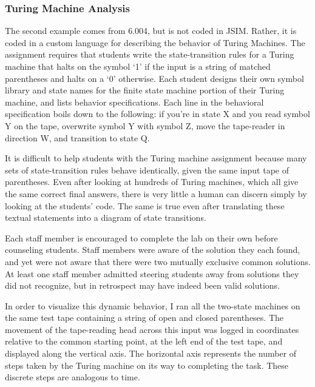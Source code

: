 \documentclass[12pt]{article}
\begin{document}
\subsubsection{Turing Machine Analysis}

The second example comes from 6.004, but is not coded in JSIM. Rather, it is coded in a custom language for describing the behavior of Turing Machines. The assignment requires that students write the state-transition rules for a Turing machine that halts on the symbol `1' if the input is a string of matched parentheses and halts on a `0' otherwise. Each student designs their own symbol library and state names for the finite state machine portion of their Turing machine, and lists behavior specifications. Each line in the behavioral specification boils down to the following: if you're in state X and you read symbol Y on the tape, overwrite symbol Y with symbol Z, move the tape-reader in direction W, and transition to state Q.

It is difficult to help students with the Turing machine assignment because many sets of state-transition rules behave identically, given the same input tape of parentheses. Even after looking at hundreds of Turing machines, which all give the same correct final answers, there is very little a human can discern simply by looking at the students' code. The same is true even after translating these textual statements into a diagram of state transitions.

Each staff member is encouraged to complete the lab on their own before counseling students. Staff members were aware of the solution they each found, and yet were not aware that there were two mutually exclusive common solutions. At least one staff member admitted steering students away from solutions they did not recognize, but in retrospect may have indeed been valid solutions.

In order to visualize this dynamic behavior, I ran all the two-state machines on the same test tape containing a string of open and closed parentheses. The movement of the tape-reading head across this input was logged in coordinates relative to the common starting point, at the left end of the test tape, and displayed along the vertical axis. The horizontal axis represents the number of steps taken by the Turing machine on its way to completing the task. These discrete steps are analogous to time. 
\end{document}
